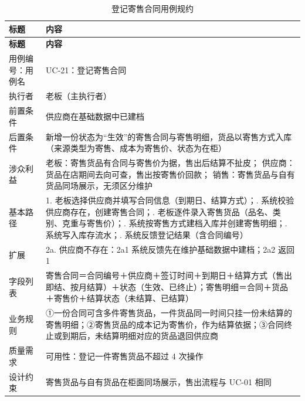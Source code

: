 {\small
\begin{longtable}{@{}L{3.0cm} L{12.3cm}@{}}
\caption{登记寄售合同用例规约}\label{tab:uc-21}\\
\toprule
\textbf{标题} & \textbf{内容} \\
\midrule
\endfirsthead
\toprule
\textbf{标题} & \textbf{内容} \\
\midrule
\endhead
用例编号：用例名 & UC-21：登记寄售合同 \\
\midrule
执行者 & 老板（主执行者） \\
\midrule
前置条件 & 供应商在基础数据中已建档 \\
\midrule
后置条件 & 新增一份状态为“生效”的寄售合同与寄售明细，货品以寄售方式入库（来源类型为寄售、成本为寄售价、状态为在柜） \\
\midrule
涉众利益 & 老板：寄售货品有合同与寄售价为据，售出后结算不扯皮；\newline
供应商：货品在店期间去向可查，售出按寄售价回款；\newline
销售：寄售货品与自有货品同场展示，无须区分维护 \\
\midrule
基本路径 & 1. 老板选择供应商并填写合同信息（到期日、结算方式）；. 系统校验供应商存在，创建寄售合同；. 老板逐件录入寄售货品（品名、类别、克重与寄售价）；. 系统按寄售方式建档入库并创建寄售明细；. 系统写入库存流水；. 系统反馈登记结果（含合同编号） \\
\midrule
扩展 & 2a. 供应商不存在：2a1 系统反馈先在维护基础数据中建档；2a2 返回1 \\
\midrule
字段列表 & 寄售合同＝合同编号＋供应商＋签订时间＋到期日＋结算方式（售出即结、按月结算）＋状态（生效、已终止）；\newline 寄售明细＝合同＋货品＋寄售价＋结算状态（未结算、已结算） \\
\midrule
业务规则 & ①一份合同可含多件寄售货品，一件货品同一时间只挂一份未结算的寄售明细；\newline ②寄售货品的成本记为寄售价，作为结算依据；\newline ③合同终止或到期后，未结算明细对应的货品退回供应商 \\
\midrule
质量需求 & 可用性：登记一件寄售货品不超过 4 次操作 \\
\midrule
设计约束 & 寄售货品与自有货品在柜面同场展示，售出流程与 UC-01 相同 \\
\midrule
\bottomrule
\end{longtable}}


